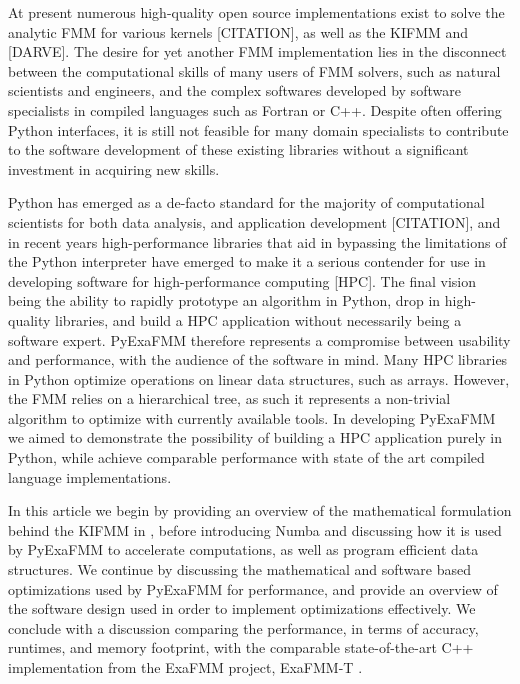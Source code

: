 \documentclass{IEEEcsmag}
\begin{document}
At present numerous high-quality open source implementations exist to solve the analytic FMM for various kernels [CITATION], as well as the KIFMM \cite{Ying2004} and [DARVE].
The desire for yet another FMM implementation lies in the disconnect between the computational skills of many users of FMM solvers, such as natural scientists and engineers, and the complex softwares developed by software specialists in compiled languages such as Fortran or C++. Despite often offering Python interfaces, it is still not feasible for many domain specialists to contribute to the software development of these existing libraries without a significant investment in acquiring new skills.

Python has emerged as a de-facto standard for the majority of computational scientists for both data analysis, and application development [CITATION], and in recent years high-performance libraries that aid in bypassing the limitations of the Python interpreter have emerged to make it a serious contender for use in developing software for high-performance computing [HPC]. The final vision being the ability to rapidly prototype an algorithm in Python, drop in high-quality libraries, and build a HPC application without necessarily being a software expert. PyExaFMM therefore represents a compromise between usability and performance, with the audience of the software in mind. Many HPC libraries in Python optimize operations on linear data structures, such as arrays. However, the FMM relies on a hierarchical tree, as such it represents a non-trivial algorithm to optimize with currently available tools. In developing PyExaFMM we aimed to demonstrate the possibility of building a HPC application purely in Python, while achieve comparable performance with state of the art compiled language implementations.

In this article we begin by providing an overview of the mathematical formulation behind the KIFMM in \cite{Ying2004}, before introducing Numba and discussing how it is used by PyExaFMM to accelerate computations, as well as program efficient data structures. We continue by discussing the mathematical and software based optimizations used by PyExaFMM for performance, and provide an overview of the software design used in order to implement optimizations effectively. We conclude with a discussion comparing the performance, in terms of accuracy, runtimes, and memory footprint, with the comparable state-of-the-art C++ implementation from the ExaFMM project, ExaFMM-T \cite{Wang2021}.
\end{document}
